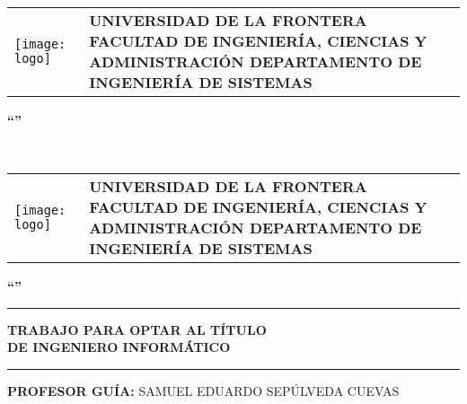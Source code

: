 
\leftskip=0cm 
\rightskip=0cm

\begin{center}
\begin{tabularx}{\textwidth}{p{3cm} >{\centering\arraybackslash}X}
	\vspace{0pt} 
	\texttt{[image: logo]}
   	& 
   	\vspace{10pt} \textbf{ \uppercase{universidad de la frontera \linebreak facultad de ingeniería, ciencias y administración \linebreak departamento de ingeniería de sistemas}}
	
\end{tabularx}
\end{center}

\null
\vfill

\begin{center}
	\textbf{ \uppercase{
	``\titulotesis''
	} }
\end{center}

\null
\vfill

\begin{center}
	\textbf{ \uppercase{
	\nombre \\
	\anyo
	} }
\end{center}

\clearpage
\newpage\null\thispagestyle{empty}\newpage

\begin{center}
\begin{tabularx}{\textwidth}{p{3cm} >{\centering\arraybackslash}X}
	\vspace{0pt} 
	\texttt{[image: logo]}
   	& 
   	\vspace{10pt} \textbf{ \uppercase{universidad de la frontera \linebreak facultad de ingeniería, ciencias y administración \linebreak departamento de ingeniería de sistemas}}
	
\end{tabularx}
\end{center}

\null
\vfill

\begin{center}
	\textbf{ \uppercase{
	``\titulotesis''
	} }
\end{center}

\null
\vfill

\rightskip=0cm
\noindent\rule{8.3cm}{1.5pt}
\setlength{\parindent}{0cm}
{
	\raggedright
	\textwidth 
	\uppercase{\textbf{trabajo para optar al título \\de ingeniero informático}
}
\noindent\rule{8.3cm}{1.5pt}

\vspace{15 mm}
\leftskip=0cm

\uppercase{\textbf{\hfill Profesor guía:} Samuel Eduardo Sepúlveda Cuevas}}

